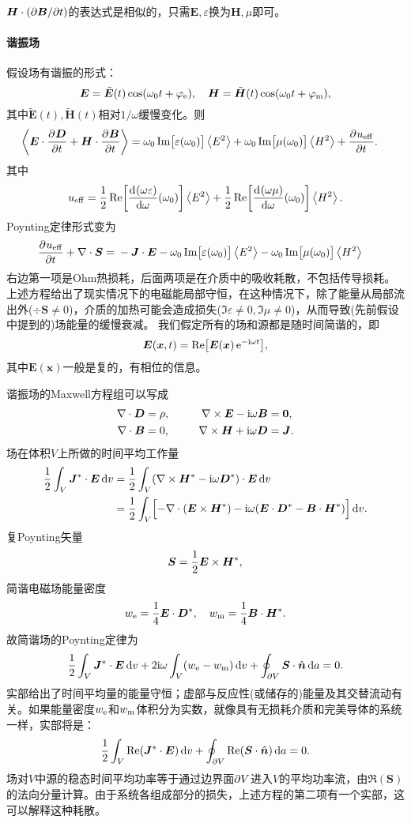 $\bm H\cdot(\partial\bm B/\partial t)$的表达式是相似的，只需$\bm E,\varepsilon$换为$\bm H,\mu$即可。
\paragraph{谐振场}
假设场有谐振的形式： 
\[
    \bm E=\tilde{\bm E}(t)\cos(\omega_0t+\varphi_\mathrm e),\quad\bm H=\tilde{\bm H}(t)\cos(\omega_0t+\varphi_\text m),
\]
其中$\tilde{\bm E}(t),\tilde{\bm H}(t)$相对$1/\omega$缓慢变化。则
\begin{align*}
    \left\langle \bm E\cdot\frac{\partial^{{}}\bm D}{\partial{t}^{{}}}+\bm H\cdot\frac{\partial^{{}}\bm B}{\partial{t}^{{}}}\right\rangle={}&\omega_0\operatorname{Im}\bigl[\varepsilon(\omega_0)\bigr]\left\langle E^2\right\rangle+
    \omega_0\operatorname{Im}\bigl[\mu(\omega_0)\bigr]\left\langle H^2\right\rangle+\frac{\partial^{{}}u_\mathrm{eff}}{\partial{t}^{{}}}.
\end{align*}
其中 
\[
    u_\mathrm{eff}=\frac12\operatorname{Re}\biggl[\frac{\mathrm{d}^{{}}(\omega\varepsilon)}{\mathrm{d}{\omega}^{{}}}(\omega_0)\biggr]\left\langle E^2\right\rangle+\frac12\operatorname{Re}\biggl[\frac{\mathrm{d}^{{}}(\omega\mu)}{\mathrm{d}{\omega}^{{}}}(\omega_0)\biggr]\left\langle H^2\right\rangle.
\]
Poynting定律形式变为
\begin{align}
    \label{eqn:Poynting with loss}
    \frac{\partial^{{}}u_\mathrm{eff}}{\partial{t}^{{}}}+\nabla\cdot\bm S={}&-\bm J\cdot\bm E-\omega_0\operatorname{Im}\bigl[\varepsilon(\omega_0)\bigr]\left\langle E^2\right\rangle-\omega_0\operatorname{Im}\bigl[\mu(\omega_0)\bigr]\left\langle H^2\right\rangle
\end{align}
右边第一项是Ohm热损耗，后面两项是在介质中的吸收耗散，不包括传导损耗。
上述方程给出了现实情况下的电磁能局部守恒，在这种情况下，除了能量从局部流出外($\div\bm S\neq 0$)，介质的加热可能会造成损失($\Im\varepsilon\neq 0,\Im\mu\neq 0$)，从而导致(先前假设中提到的)场能量的缓慢衰减。
我们假定所有的场和源都是随时间简谐的，即 
\[
    \bm E(\bm x,t)=\operatorname{Re}\bigl[\bm E(\bm x)\mathop{}\!\mathrm{e}^{-\mathrm{i}\omega t}\bigr],
\]
其中$\bm E(\bm x)$一般是复的，有相位的信息。

谐振场的Maxwell方程组可以写成
\begin{alignat*}{2}
    \nabla\cdot\bm D&=\rho,&\qquad\nabla\times\bm E-\mathrm{i}\omega\bm B&=\bm 0,\\
    \nabla\cdot\bm B&=0,&\nabla\times\bm H+\mathrm{i}\omega\bm D&=\bm J.  
\end{alignat*}
场在体积$V$上所做的时间平均工作量
\begin{align*}
    \frac12\int_V\bm J^\ast\cdot\bm E\mathop{}\!\mathrm{d} v&=\frac12\int_V(\nabla\times\bm H^\ast-\mathrm{i}\omega\bm D^\ast)\cdot\bm E\mathop{}\!\mathrm{d} v\\
    &=\frac12\int_V\Bigl[-\nabla\cdot(\bm E\times\bm H^\ast)-\mathrm{i}\omega(\bm E\cdot\bm D^\ast-\bm B\cdot\bm H^\ast)\Bigr]\mathop{}\!\mathrm{d} v.
\end{align*}
复Poynting矢量
\[
    \bm S=\frac12\bm E\times\bm H^\ast,
\]
简谐电磁场能量密度
\[
    w_\mathrm e=\frac14\bm E\cdot\bm D^\ast,\quad w_\text m=\frac14\bm B\cdot\bm H^\ast.
\]
故简谐场的Poynting定律为
\[
    \frac12\int_V\bm J^\ast\cdot\bm E\mathop{}\!\mathrm{d} v+2\mathrm{i}\omega\int_V(w_\mathrm e-w_\text m)\mathop{}\!\mathrm{d} v+\oint_{\partial V}\bm S\cdot\mathop{}\!\hat{\bm{n}}\mathop{}\!\mathrm{d} a=0.
\]
实部给出了时间平均量的能量守恒；虚部与反应性(或储存的)能量及其交替流动有关。如果能量密度$w_\mathrm e$和$w_\text m$体积分为实数，就像具有无损耗介质和完美导体的系统一样，实部将是：
\[
    \frac12\int_V\operatorname{Re}(\bm J^\ast\cdot\bm E)\mathop{}\!\mathrm{d} v+\oint_{\partial V}\operatorname{Re}(\bm S\cdot\mathop{}\!\hat{\bm{n}})\mathop{}\!\mathrm{d} a=0.
\]
场对$V$中源的稳态时间平均功率等于通过边界面$\partial V$进入$V$的平均功率流，由$\Re(\bm S)$的法向分量计算。由于系统各组成部分的损失，上述方程的第二项有一个实部，这可以解释这种耗散。
